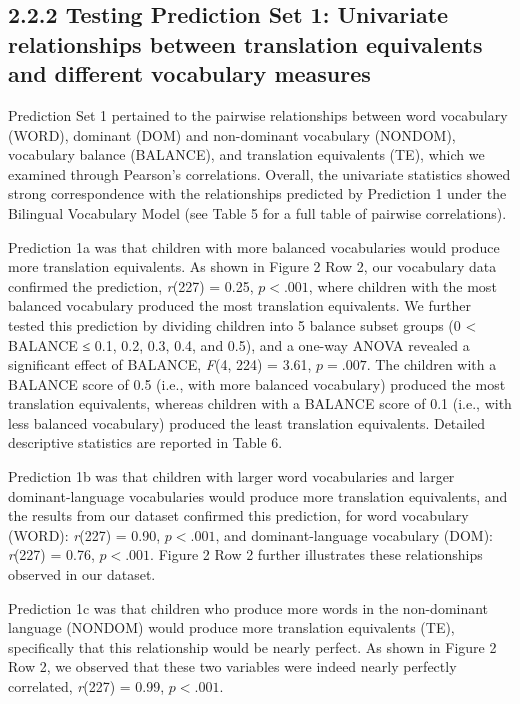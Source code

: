 \documentclass[
  english,
  ,man,floatsintext]{apa6}
\begin{document}
\hypertarget{testing-prediction-set-1-univariate-relationships-between-translation-equivalents-and-different-vocabulary-measures}{%
\subsection{2.2.2 Testing Prediction Set 1: Univariate relationships between translation equivalents and different vocabulary measures}\label{testing-prediction-set-1-univariate-relationships-between-translation-equivalents-and-different-vocabulary-measures}}

Prediction Set 1 pertained to the pairwise relationships between word vocabulary (WORD), dominant (DOM) and non-dominant vocabulary (NONDOM), vocabulary balance (BALANCE), and translation equivalents (TE), which we examined through Pearson's correlations. Overall, the univariate statistics showed strong correspondence with the relationships predicted by Prediction 1 under the Bilingual Vocabulary Model (see Table 5 for a full table of pairwise correlations).

Prediction 1a was that children with more balanced vocabularies would produce more translation equivalents. As shown in Figure 2 Row 2, our vocabulary data confirmed the prediction, \emph{r}(227) = 0.25, \(p < .001\), where children with the most balanced vocabulary produced the most translation equivalents. We further tested this prediction by dividing children into 5 balance subset groups (0 \textless{} BALANCE ≤ 0.1, 0.2, 0.3, 0.4, and 0.5), and a one-way ANOVA revealed a significant effect of BALANCE, \emph{F}(4, 224) = 3.61, \(p = .007\). The children with a BALANCE score of 0.5 (i.e., with more balanced vocabulary) produced the most translation equivalents, whereas children with a BALANCE score of 0.1 (i.e., with less balanced vocabulary) produced the least translation equivalents. Detailed descriptive statistics are reported in Table 6.

Prediction 1b was that children with larger word vocabularies and larger dominant-language vocabularies would produce more translation equivalents, and the results from our dataset confirmed this prediction, for word vocabulary (WORD): \emph{r}(227) = 0.90, \(p < .001\), and dominant-language vocabulary (DOM): \emph{r}(227) = 0.76, \(p < .001\). Figure 2 Row 2 further illustrates these relationships observed in our dataset.

Prediction 1c was that children who produce more words in the non-dominant language (NONDOM) would produce more translation equivalents (TE), specifically that this relationship would be nearly perfect. As shown in Figure 2 Row 2, we observed that these two variables were indeed nearly perfectly correlated, \emph{r}(227) = 0.99, \(p < .001\).
\end{document}
